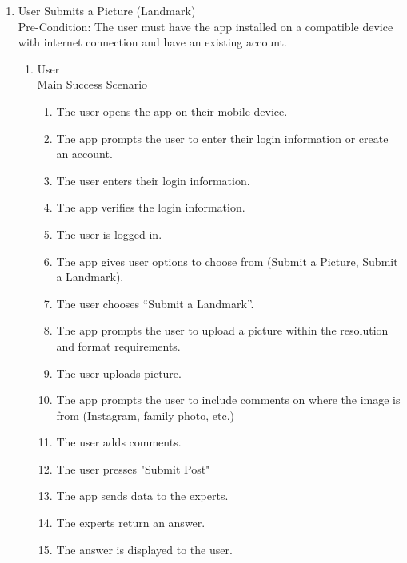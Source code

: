 \documentclass[]{article}
\begin{document}
\begin{enumerate}[{\bf BE1.}]
		\item User Submits a Picture (Landmark)
        \\ Pre-Condition: The user must have the app installed on a compatible device with internet connection and have an existing account. 
		\begin{enumerate}[{\bf VP1.}]
			\item User \\
				Main Success Scenario
                    \begin{enumerate}[{1.}]
                        \item The user opens the app on their mobile device.
                        \item The app prompts the user to enter their login information or create an account.
                        \item The user enters their login information.
                        \item The app verifies the login information.
                        \item The user is logged in.
                        \item The app gives user options to choose from (Submit a Picture, Submit a Landmark). 
                        \item The user chooses “Submit a Landmark”. 
                        \item The app prompts the user to upload a picture within the resolution and format requirements.
                        \item The user uploads picture.
                        \item The app prompts the user to include comments on where the image is from (Instagram, family photo, etc.) 
                        \item The user adds comments.
                        \item The user presses "Submit Post"
                        \item The app sends data to the experts.
                        \item The experts return an answer. 
                        \item The answer is displayed to the user. \\
                    \end{enumerate}
                    

\end{enumerate}
\end{enumerate}
\end{document}
